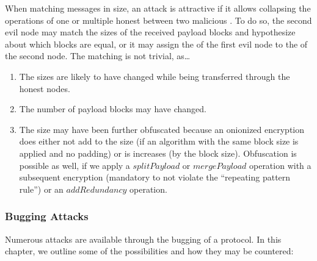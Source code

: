 When matching messages in size, an attack is attractive if it allows collapsing the operations of one or multiple honest \VortexNodes{} between two malicious \VortexNodes. To do so, the second evil node may match the sizes of the received payload blocks and hypothesize about which blocks are equal, or it may assign the  of the first evil node to the  of the second node. The matching is not trivial, as\ldots

\begin{enumerate}
	\item The sizes are likely to have changed while being transferred through the honest nodes.
	\item The number of payload blocks may have changed.
	\item The size may have been further obfuscated because an onionized encryption does either not add to the size (if an algorithm with the same block size is applied and no padding) or is increases (by the block size). Obfuscation is possible as well, if we apply a $splitPayload$ or $mergePayload$ operation with a subsequent encryption (mandatory to not violate the ``repeating pattern rule'') or an $addRedundancy$ operation.
\end{enumerate}

\subsubsection{Bugging Attacks}
Numerous attacks are available through the bugging of a protocol. In this chapter, we outline some of the possibilities and how they may be countered:

